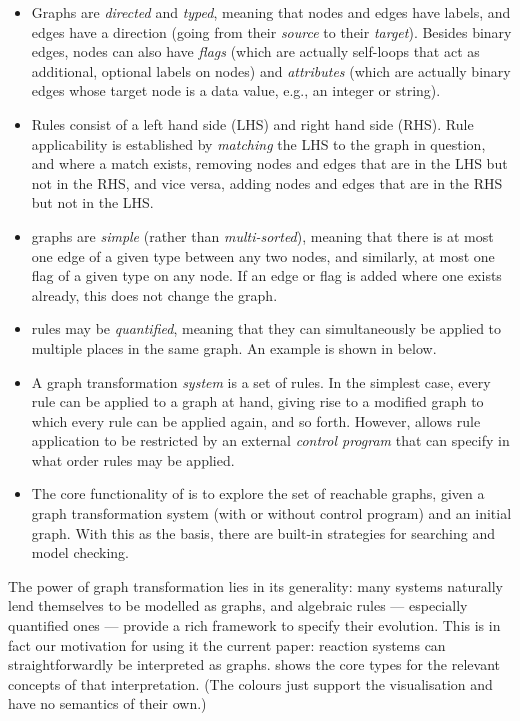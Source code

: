 \begin{itemize}
\item Graphs are \emph{directed} and \emph{typed}, meaning that nodes and edges have labels, and edges have a direction (going from their \emph{source} to their \emph{target}). Besides binary edges, nodes can also have \emph{flags} (which are actually self-loops that act as additional, optional labels on nodes) and \emph{attributes} (which are actually binary edges whose target node is a data value, e.g., an integer or string).

\item Rules consist of a left hand side (LHS) and right hand side (RHS). Rule applicability is established by \emph{matching} the LHS to the graph in question, and where a match exists, removing nodes and edges that are in the LHS but not in the RHS, and vice versa, adding nodes and edges that are in the RHS but not in the LHS.

\item \GROOVE graphs are \emph{simple} (rather than \emph{multi-sorted}), meaning that there is at most one edge of a given type between any two nodes, and similarly, at most one flag of a given type on any node. If an edge or flag is added where one exists already, this does not change the graph.

\item \GROOVE rules may be \emph{quantified}, meaning that they can simultaneously be applied to multiple places in the same graph. An example is shown in  below.

\item A graph transformation \emph{system} is a set of rules. In the simplest case, every rule can be applied to a graph at hand, giving rise to a modified graph to which every rule can be applied again, and so forth. However, \GROOVE allows rule application to be restricted by an external \emph{control program} that can specify in what order rules may be applied.

\item The core functionality of \GROOVE is to explore the set of reachable graphs, given a graph transformation system (with or without control program) and an initial graph. With this as the basis, there are built-in strategies for searching and model checking.
\end{itemize}
%
The power of graph transformation lies in its generality: many systems naturally lend themselves to be modelled as graphs, and algebraic rules --- especially quantified ones --- provide a rich framework to specify their evolution. This is in fact our motivation for using it the current paper: reaction systems can straightforwardly be interpreted as graphs.  shows the core types for the relevant concepts of that interpretation. (The colours just support the visualisation and have no semantics of their own.)

